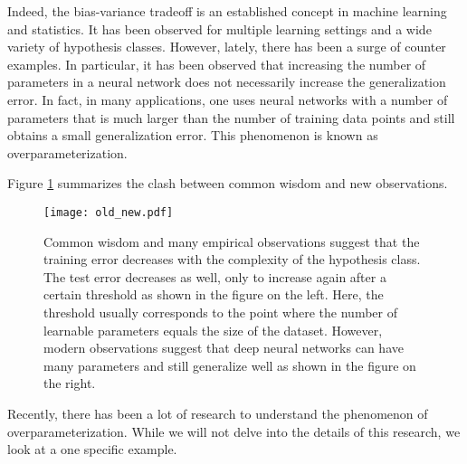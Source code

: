 Indeed, the bias-variance tradeoff is an established concept in machine learning
and statistics. It has been observed for multiple learning settings and a wide
variety of hypothesis classes. However, lately, there has been a surge of
counter examples. In particular, it has been observed that increasing the number
of parameters in a neural network does not necessarily increase the
generalization error. In fact, in many applications, one uses neural networks
with a number of parameters that is much larger than the number of training data
points and still obtains a small generalization error. This phenomenon is
known as overparameterization.

Figure \cref{Fig:old_new} summarizes the clash between common wisdom and new observations.

\begin{figure}[htbp]
	\label{Fig:old_new}
		\centering
		\texttt{[image: old\_new.pdf]}
		\caption{Common wisdom and many empirical observations suggest that the training error decreases with the complexity of the hypothesis class. The test error decreases as well, only to increase again after a certain threshold as shown in the figure on the left. Here, the threshold usually corresponds to the point where the number of learnable parameters equals the size of the dataset. However, modern observations suggest that deep neural networks can have many parameters and still generalize well as shown in the figure on the right.}
\end{figure}
Recently, there has been a lot of research to understand the phenomenon of
overparameterization. While we will not delve into the details of this research,
we look at a one specific example. 
